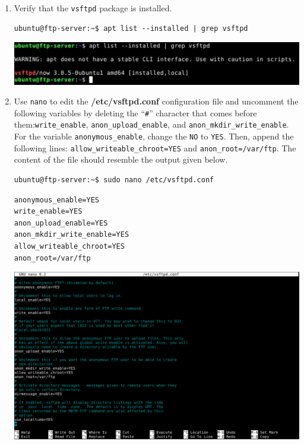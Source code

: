 \documentclass[letterpaper, 12pt]{article}
\begin{document}
\begin{enumerate}
    \item Verify that the \texttt{vsftpd} package is installed.
\begin{lstlisting}
ubuntu@ftp-server:~$ apt list --installed | grep vsftpd
\end{lstlisting}

    \begin{center}
        \includegraphics[width=\linewidth]{images/part1/step42.png}
    \end{center}

    \item Use \texttt{nano} to edit the \textbf{/etc/vsftpd.conf} configuration file and uncomment the following
    variables by deleting the ``\texttt{\#}'' character that comes before them:\texttt{write\_enable},
    \texttt{anon\_upload\_enable}, and \texttt{anon\_mkdir\_write\_enable}. For the variable \texttt{anonymous\_enable},
    change the \texttt{NO} to \texttt{YES}. Then, append the following lines:
    \texttt{allow\_writeable\_chroot=YES} and \texttt{anon\_root=/var/ftp}. The content of the file should resemble the
    output given below.
\begin{lstlisting}
ubuntu@ftp-server:~$ sudo nano /etc/vsftpd.conf
\end{lstlisting}
\begin{lstlisting}
anonymous_enable=YES
write_enable=YES
anon_upload_enable=YES
anon_mkdir_write_enable=YES
allow_writeable_chroot=YES
anon_root=/var/ftp
\end{lstlisting}

    \begin{center}
        \includegraphics[width=\linewidth]{images/part1/step43.png}
    \end{center}


\end{enumerate}
\end{document}
